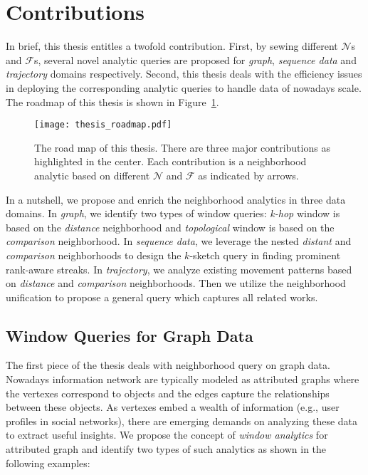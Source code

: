 \section{Contributions}
In brief, this thesis entitles a twofold contribution.
First, by sewing different $\mathcal{N}$s and $\mathcal{F}$s, 
several novel analytic queries are proposed for 
\emph{graph}, \emph{sequence data} and \emph{trajectory} domains respectively. 
Second, this thesis
deals with the efficiency issues in deploying the corresponding analytic queries to
handle data of nowadays scale.
The roadmap of this thesis is shown in Figure~\ref{fig:thesis_roadmap}.
\begin{figure}[h]
\centering
\texttt{[image: thesis\_roadmap.pdf]}
\caption{The road map of this thesis. There are three major contributions as highlighted in the center. Each contribution
is a neighborhood analytic based on different $\mathcal{N}$ and $\mathcal{F}$ as indicated by arrows.} 
\label{fig:thesis_roadmap}
\end{figure}

In a nutshell, we propose and enrich the neighborhood analytics in three data domains. 
In \emph{graph}, we identify two types
of window queries: \emph{k-hop} window is based on the \emph{distance} neighborhood
and \emph{topological} window is based on the \emph{comparison} neighborhood. 
In \emph{sequence data}, we leverage the nested \emph{distant} and \emph{comparison} neighborhoods 
to design the $k$-sketch query in finding prominent rank-aware streaks.
In \emph{trajectory}, we analyze existing movement patterns based
on \emph{distance} and \emph{comparison} neighborhoods. Then we utilize the neighborhood unification to propose a general query
which captures all related works.

\subsection{Window Queries for Graph Data}
The first piece of the thesis deals with neighborhood query
on graph data. Nowadays information network are typically
modeled as attributed graphs where the 
vertexes correspond to objects and the edges capture the
relationships between these objects. As vertexes embed a wealth
of information (e.g., user profiles in social networks), there are 
emerging demands on analyzing these data to extract useful insights. 
We propose the concept of \emph{window analytics} 
for attributed graph and identify two types of such analytics as shown in the following examples:

